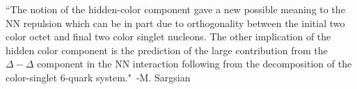 ``The notion of the hidden-color component gave a new possible meaning to the NN repulsion which can be in part due to orthogonality between the initial two color octet and final two color singlet nucleons. The other implication of the hidden color component is the prediction of the large contribution from the $\Delta-\Delta$ component in the NN interaction following from the decomposition of the color-singlet 6-quark system."~-M. Sargsian~\cite{Sargsian:2014bwa}

